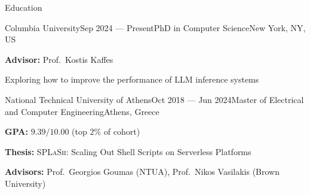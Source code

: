\documentclass[letterpaper, 12pt]{resume}
\begin{document}

\begin{rSection}{Education}
    \begin{rSubsection}{Columbia University}{Sep 2024 --- Present}{PhD in Computer Science}{New York, NY, US}
        \item \textbf{Advisor:} Prof.\ Kostis Kaffes
        \item Exploring how to improve the performance of LLM inference systems
    \end{rSubsection}

    \begin{rSubsection}{National Technical University of Athens}{Oct 2018 --- Jun 2024}{Master of Electrical and Computer Engineering}{Athens, Greece}
        \item \textbf{GPA:} \( 9.39/10.00 \) (top \( 2\% \) of cohort)
        \item \textbf{Thesis:} \textsc{SPLaSh}: Scaling Out Shell Scripts on Serverless Platforms
        \item \textbf{Advisors:} Prof.\ Georgios Goumas (NTUA), Prof.\ Nikos Vasilakis (Brown University)
    \end{rSubsection}
\end{rSection}
\end{document}
